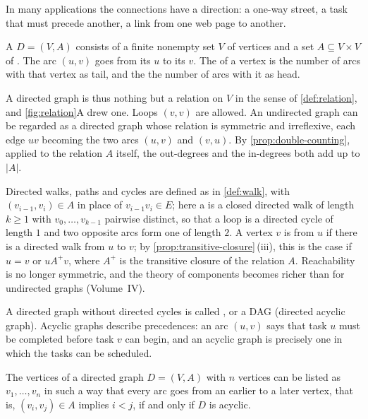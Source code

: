In many applications the connections have a direction: a one-way street, a task that must precede another, a link from one web page to another.

\begin{definition}
\label{def:digraph}
A  $D=(V,A)$ consists of a finite nonempty set $V$ of vertices and a set $A\subseteq V\times V$ of . The arc $(u,v)$ goes from its  $u$ to its  $v$. The  of a vertex is the number of arcs with that vertex as tail, and the  the number of arcs with it as head.
\end{definition}

A directed graph is thus nothing but a relation on $V$ in the sense of \cref{def:relation}, and \cref{fig:relation}A drew one. Loops $(v,v)$ are allowed. An undirected graph can be regarded as a directed graph whose relation is symmetric and irreflexive, each edge $uv$ becoming the two arcs $(u,v)$ and $(v,u)$. By \cref{prop:double-counting}, applied to the relation $A$ itself, the out-degrees and the in-degrees both add up to $|A|$.

Directed walks, paths and cycles are defined as in \cref{def:walk}, with $(v_{i-1},v_i)\in A$ in place of $v_{i-1}v_i\in E$; here a  is a closed directed walk of length $k\ge1$ with $v_0,\ldots,v_{k-1}$ pairwise distinct, so that a loop is a directed cycle of length $1$ and two opposite arcs form one of length $2$. A vertex $v$ is  from $u$ if there is a directed walk from $u$ to $v$; by \cref{prop:transitive-closure}\,(iii), this is the case if $u=v$ or $u\mathrel{A^+}v$, where $A^+$ is the transitive closure of the relation $A$. Reachability is no longer symmetric, and the theory of components becomes richer than for undirected graphs (Volume~IV).

A directed graph without directed cycles is called , or a DAG (directed acyclic graph). Acyclic graphs describe precedences: an arc $(u,v)$ says that task $u$ must be completed before task $v$ can begin, and an acyclic graph is precisely one in which the tasks can be scheduled.

\begin{proposition}
\label{prop:topological}
The vertices of a directed graph $D=(V,A)$ with $n$ vertices can be listed as $v_1,\ldots,v_n$ in such a way that every arc goes from an earlier to a later vertex, that is, $(v_i,v_j)\in A$ implies $i<j$, if and only if $D$ is acyclic.
\end{proposition}

